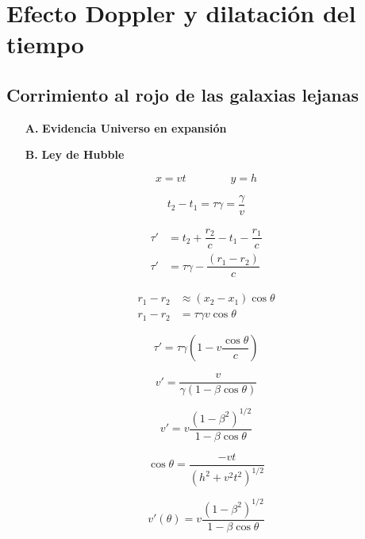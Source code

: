 \documentclass[../main]{subfiles}
\begin{document}
\chapter{Efecto Doppler y dilatación del tiempo}

\section{Corrimiento al rojo de las galaxias lejanas}
\begin{itemize}
    \item[\textbf{A.}]  \textbf{Evidencia Universo en expansión}
    \item[\textbf{B.}]  \textbf{Ley de Hubble}
\end{itemize}

\begin{equation*}
    x=vt \qquad \qquad y=h
\end{equation*}

\begin{equation*}
    t_2-t_1=\tau \gamma=\dfrac{\gamma}{v}
\end{equation*}

\begin{align*}
    \tau'&=t_2+\dfrac{r_2}{c}-t_1-\dfrac{r_1}{c} \\
    \tau'&=\tau \gamma -\dfrac{(r_1-r_2)}{c}
\end{align*}

\begin{align*}
    r_1-r_2&\approx (x_2-x_1)\cos{\theta} \\
    r_1-r_2&=\tau \gamma v \cos{\theta}
\end{align*}

\begin{equation*}
    \tau'=\tau \gamma\left( 1-v\dfrac{\cos{\theta}}{c}\right)
\end{equation*}

\begin{equation*}
    v'=\dfrac{v}{\gamma(1-\beta \cos{\theta})}
\end{equation*}

\begin{equation}
    v'=v \dfrac{(1-\beta^2)^{1/2}}{1-\beta \cos{\theta}}
\end{equation}

\begin{equation}
    \cos{\theta}=\dfrac{-vt}{(h^2+v^2t^2)^{1/2}}
\end{equation}

\begin{equation*}
    v'(\theta)=v \dfrac{(1-\beta^2)^{1/2}}{1-\beta \cos{\theta}}
\end{equation*}
\end{document}
